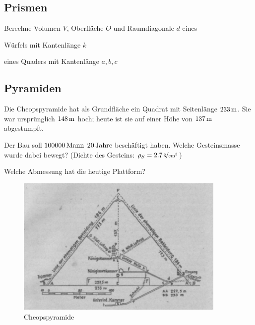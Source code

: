 \documentclass[%
11pt,%
twoside,%
titlepage,%
german,%
headsepline%
]{scrartcl}
\begin{document}
\subsection{Prismen}
\begin{ueb}
Berechne Volumen $V$, Oberfl\"ache $O$ und Raumdiagonale $d$ eines
\begin{enumeratea}
\item W\"urfels mit Kantenl\"ange $k$
\item eines Quaders mit Kantenl\"ange $a,b,c$
\end{enumeratea}
\end{ueb}

\subsection{Pyramiden}
\begin{ueb}
Die Cheopspyramide hat als Grundfl\"ache ein Quadrat mit Seitenl\"ange $\unit[233]{m}$. Sie war urspr\"unglich $\unit[148]{m}$ hoch; heute ist sie auf einer H\"ohe von $\unit[137]{m}$ abgestumpft.
\begin{enumeratea}
\item Der Bau soll $\unit[100000]{Mann}$ $\unit[20]{Jahre}$ besch\"aftigt haben. Welche Gesteinsmasse wurde dabei bewegt? (Dichte des Gesteins: $\rho_S=\unitfrac[2.7]{g}{cm^3}$)
\item Welche Abmessung hat die heutige Plattform?
\end{enumeratea}

\begin{figure}[h!]
\begin{center}
\includegraphics[width=0.9\textwidth]{pictures/cheops}
\caption{Cheopspyramide}
\end{center}
\end{figure}

\end{ueb}
\end{document}
